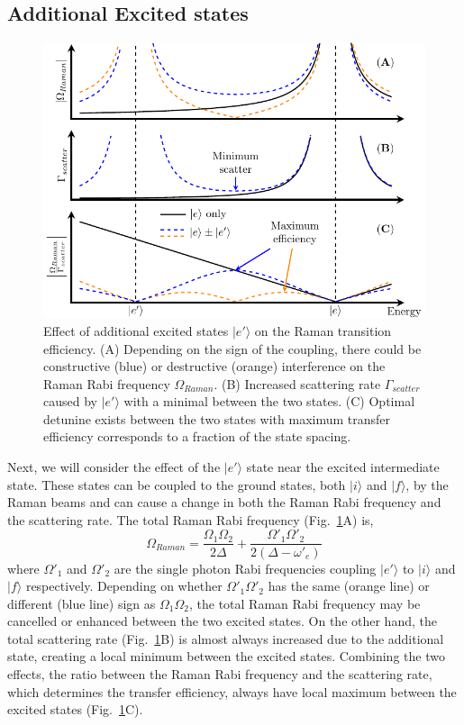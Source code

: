 \subsection{Additional Excited states}

\begin{figure}
  \centering
  \includegraphics[width=\textwidth]{figures/raman_transfer_extra_ext_states.pdf}
  \caption[Raman transition with additional excited states]{
    Effect of additional excited states $|e'\rangle$ on the Raman transition efficiency.
    (A) Depending on the sign of the coupling, there could be constructive (blue)
    or destructive (orange) interference on the Raman Rabi frequency $\Omega_{Raman}$.
    (B) Increased scattering rate $\Gamma_{scatter}$ caused by $|e'\rangle$ with a minimal
    between the two states.
    (C) Optimal detunine exists between the two states with maximum transfer efficiency
    corresponds to a fraction of the state spacing.
    \label{fig:raman-transfer-extra-ext-states}}
\end{figure}

Next, we will consider the effect of the $|e'\rangle$ state near the excited intermediate state.
These states can be coupled to the ground states, both $|i\rangle$ and $|f\rangle$,
by the Raman beams and can cause a change in both the Raman Rabi frequency
and the scattering rate.
The total Raman Rabi frequency (Fig.~\ref{fig:raman-transfer-extra-ext-states}A) is,
\[
  \Omega_{Raman}=\frac{\Omega_1\Omega_2}{2\Delta}+\frac{\Omega'_1\Omega'_2}{2(\Delta-\omega'_e)}
\]
where $\Omega'_1$ and $\Omega'_2$ are the single photon Rabi frequencies coupling $|e'\rangle$
to $|i\rangle$ and $|f\rangle$ respectively.
Depending on whether $\Omega'_1\Omega'_2$ has the same (orange line)
or different (blue line) sign as $\Omega_1\Omega_2$, the total Raman Rabi frequency
may be cancelled or enhanced between the two excited states.
On the other hand, the total scattering rate (Fig.~\ref{fig:raman-transfer-extra-ext-states}B)
is almost always increased due to the additional state, creating a local minimum
between the excited states.
Combining the two effects, the ratio between the Raman Rabi frequency and
the scattering rate, which determines the transfer efficiency, always have local maximum
between the excited states (Fig.~\ref{fig:raman-transfer-extra-ext-states}C).

